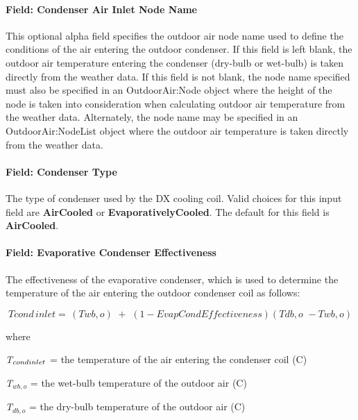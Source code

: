 \paragraph{Field: Condenser Air Inlet Node Name}\label{field-condenser-air-inlet-node-name}

This optional alpha field specifies the outdoor air node name used to define the conditions of the air entering the outdoor condenser. If this field is left blank, the outdoor air temperature entering the condenser (dry-bulb or wet-bulb) is taken directly from the weather data. If this field is not blank, the node name specified must also be specified in an OutdoorAir:Node object where the height of the node is taken into consideration when calculating outdoor air temperature from the weather data. Alternately, the node name may be specified in an OutdoorAir:NodeList object where the outdoor air temperature is taken directly from the weather data.

\paragraph{Field: Condenser Type}\label{field-condenser-type}

The type of condenser used by the DX cooling coil. Valid choices for this input field are \textbf{AirCooled} or \textbf{EvaporativelyCooled}. The default for this field is \textbf{AirCooled}.

\paragraph{Field: Evaporative Condenser Effectiveness}\label{field-evaporative-condenser-effectiveness}

The effectiveness of the evaporative condenser, which is used to determine the temperature of the air entering the outdoor condenser coil as follows:

\begin{equation}
Tcond\,inlet = \,\left( {Twb,o} \right)\,\, + \,\,\left( {1 - EvapCondEffectiveness} \right)\left( {Tdb,o\,\, - Twb,o} \right)
\end{equation}

where

\emph{T\(_{cond\\ inlet}\)} = the temperature of the air entering the condenser coil (C)

\emph{T\(_{wb,o}\)} = the wet-bulb temperature of the outdoor air (C)

\emph{T\(_{db,o}\)} = the dry-bulb temperature of the outdoor air (C)

